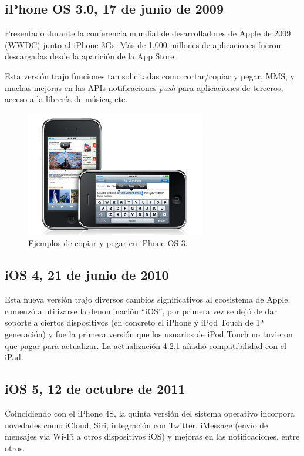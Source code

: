 \subsection{iPhone OS 3.0, 17 de junio de 2009}
Presentado durante la conferencia mundial de desarrolladores de Apple de 2009 (WWDC) junto al iPhone 3Gs. Más de 1.000 millones de aplicaciones fueron descargadas desde la aparición de la App Store.

Esta versión trajo funciones tan solicitadas como cortar/copiar y pegar, MMS, y muchas mejoras en las APIs notificaciones \emph{push} para aplicaciones de terceros, acceso a la librería de música, etc.

\begin{figure}[h]
	\centering
		\includegraphics[width=0.7\textwidth]{./img/iOS3.jpg}
	\caption{Ejemplos de copiar y pegar en iPhone OS 3.}
\end{figure}

\subsection{iOS 4, 21 de junio de 2010}
Esta nueva versión trajo diversos cambios significativos al ecosistema de Apple: comenzó a utilizarse la denominación ``iOS'', por primera vez se dejó de dar soporte a ciertos dispositivos (en concreto el iPhone y iPod Touch de 1ª generación) y fue la primera versión que los usuarios de iPod Touch no tuvieron que pagar para actualizar. La actualización 4.2.1 añadió compatibilidad con el iPad.

\subsection{iOS 5, 12 de octubre de 2011}
Coincidiendo con el iPhone 4S, la quinta versión del sistema operativo incorpora novedades como iCloud, Siri, integración con Twitter, iMessage (envío de mensajes via Wi-Fi a otros dispositivos iOS) y mejoras en las notificaciones, entre otros.

